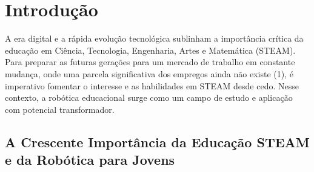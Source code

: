 \documentclass[%
  a4paper,%
  12pt,%
  fleqn,%
  english,%
  brazilian,%
]{article}
\begin{document}
% 

\section{Introdução}%
\label{sect:intro}

A era digital e a rápida evolução tecnológica sublinham a importância crítica da educação em Ciência, Tecnologia, Engenharia, Artes e Matemática (STEAM). Para preparar as futuras gerações para um mercado de trabalho em constante mudança, onde uma parcela significativa dos empregos ainda não existe (1), é imperativo fomentar o interesse e as habilidades em STEAM desde cedo. Nesse contexto, a robótica educacional surge como um campo de estudo e aplicação com potencial transformador.

\subsection{A Crescente Importância da Educação STEAM e da Robótica para Jovens}
\end{document}
